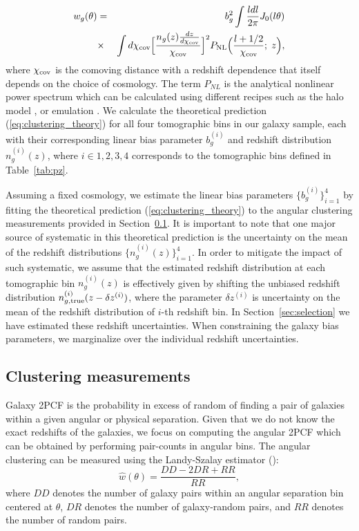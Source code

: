 \documentclass[fleqn,usenatbib,useAMS]{mnras}
\begin{document}
\begin{eqnarray}
w_{g}(\theta) &=& b_g^2 \int \frac{l dl}{2\pi}J_{0}(l\theta)  \nonumber \\ 
            &\times& \int d\chi_{\rm cov} \Big[\frac{n_{g}(z)\frac{dz}{d\chi_{\rm cov}}}{\chi_{\rm cov}}\Big]^{2}P_{\rm NL}\Big(\frac{l+1/2}{\chi_{\rm cov}}; \; z\Big),                  
\label{eq:clustering_theory}
\end{eqnarray}
where $\chi_{\rm cov}$ is the comoving distance with a redshift dependence that itself depends on the choice of cosmology. The term $P_{NL}$ is the analytical nonlinear power spectrum which can be calculated using different recipes such as the halo model \citep[e.g. ][]{takahashi2012, mead2015, smith2019}, or emulation \citep[e.g.][]{emu2014}. We calculate the theoretical prediction (\ref{eq:clustering_theory}) for all four tomographic bins in our galaxy sample, each with their corresponding linear bias parameter $b^{(i)}_{g}$ and redshift distribution $n^{(i)}_{g}(z)$, where $i\in {1,2,3,4}$ corresponds to the tomographic bins defined in Table~\ref{tab:pz}.

Assuming a fixed cosmology, we estimate the linear bias parameters $\{b^{(i)}_{g}\}_{i=1}^{4}$ by fitting the theoretical prediction (\ref{eq:clustering_theory}) to the angular clustering measurements provided in Section~\ref{sec:measurement}. It is important to note that one major source of systematic in this theoretical prediction is the uncertainty on the mean of the redshift distributions $\{n_{g}^{(i)}(z)\}_{i=1}^{4}$. In order to mitigate the impact of such systematic, we assume that the estimated redshift distribution at each tomographic bin $n_{g}^{(i)}(z)$ is effectively given by shifting the unbiased redshift distribution $n_{g, \rm true}^{(i)}(z - \delta z^{(i)})$, where the parameter $\delta z^{(i)}$ is uncertainty on the mean of the redshift distribution of $i$-th redshift bin. In Section~\ref{sec:selection} we have estimated these redshift uncertainties. When constraining the galaxy bias parameters, we marginalize over the individual redshift uncertainties. 

\subsection{Clustering measurements}\label{sec:measurement}

Galaxy 2PCF is the probability in excess of random of finding a pair of galaxies within a given angular or physical separation. Given that we do not know the exact redshifts of the galaxies, we focus on computing the angular 2PCF which can be obtained by performing pair-counts in angular bins. The angular clustering can be measured using the Landy-Szalay estimator (\citealt{landy}):
\begin{equation}
    \hat{w}(\theta) = \frac{DD-2DR+RR}{RR},
\label{eq:landy}
\end{equation}
where $DD$ denotes the number of galaxy pairs within an angular separation bin centered at $\theta$, $DR$ denotes the number of galaxy-random pairs, and $RR$ denotes the number of random pairs. 
\end{document}
